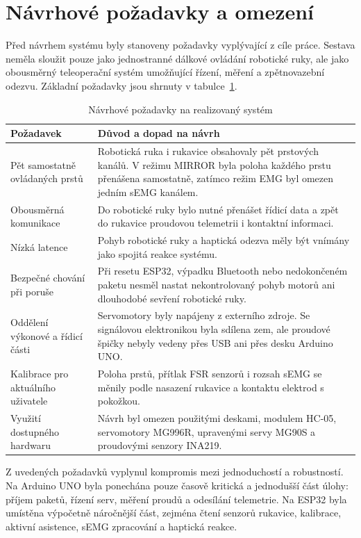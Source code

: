 \section{Návrhové požadavky a omezení}
\label{sec:pozadavky-omezeni}

Před návrhem systému byly stanoveny požadavky vyplývající z cíle práce. Sestava neměla sloužit pouze jako jednostranné dálkové ovládání robotické ruky, ale jako obousměrný teleoperační systém umožňující řízení, měření a zpětnovazební odezvu. Základní požadavky jsou shrnuty v tabulce~\ref{tab:pozadavky-system}.

\begin{table}[H]
\centering
\caption{Návrhové požadavky na realizovaný systém}
\label{tab:pozadavky-system}
\begin{tabular}{|p{}|p{}|}
\hline
\textbf{Požadavek} & \textbf{Důvod a dopad na návrh} \\
\hline
Pět samostatně ovládaných prstů & Robotická ruka i rukavice obsahovaly pět prstových kanálů. V režimu MIRROR byla poloha každého prstu přenášena samostatně, zatímco režim EMG byl omezen jedním sEMG kanálem. \\
\hline
Obousměrná komunikace & Do robotické ruky bylo nutné přenášet řídicí data a zpět do rukavice proudovou telemetrii i kontaktní informaci. \\
\hline
Nízká latence & Pohyb robotické ruky a haptická odezva měly být vnímány jako spojitá reakce systému. \\
\hline
Bezpečné chování při poruše & Při resetu ESP32, výpadku Bluetooth nebo nedokončeném paketu nesměl nastat nekontrolovaný pohyb motorů ani dlouhodobé sevření robotické ruky. \\
\hline
Oddělení výkonové a řídicí části & Servomotory byly napájeny z externího zdroje. Se signálovou elektronikou byla sdílena zem, ale proudové špičky nebyly vedeny přes USB ani přes desku Arduino UNO\@. \\
\hline
Kalibrace pro aktuálního uživatele & Poloha prstů, přítlak FSR senzorů i rozsah sEMG se měnily podle nasazení rukavice a kontaktu elektrod s pokožkou. \\
\hline
Využití dostupného hardwaru & Návrh byl omezen použitými deskami, modulem HC-05, servomotory MG996R, upravenými servy MG90S a proudovými senzory INA219. \\
\hline
\end{tabular}
\end{table}

Z uvedených požadavků vyplynul kompromis mezi jednoduchostí a robustností. Na Arduino UNO byla ponechána pouze časově kritická a jednodušší část úlohy: příjem paketů, řízení serv, měření proudů a odesílání telemetrie. Na ESP32 byla umístěna výpočetně náročnější část, zejména čtení senzorů rukavice, kalibrace, aktivní asistence, sEMG zpracování a haptická reakce.

